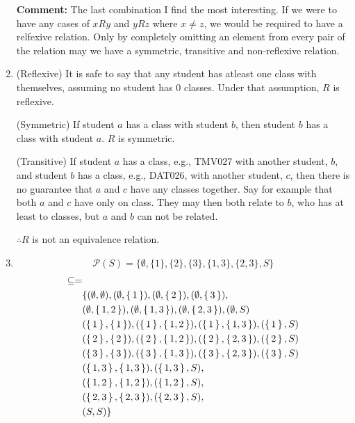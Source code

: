 \documentclass{article}
\begin{document}
\begin{enumerate}
        \textbf{Comment:} The last combination I find the most interesting. If we were to have any cases of $xRy$ and $yRz$ where $x\neq z$, we would be required to have a relfexive relation. Only by completely omitting an element from every pair of the relation may we have a symmetric, transitive and non-reflexive relation. 

    \item
        (Reflexive) It is safe to say that any student has atleast one class with themselves, assuming no student has 0 classes. Under that assumption, $R$ is reflexive.

        (Symmetric) If student $a$ has a class with student $b$, then student $b$ has a class with student $a$. $R$ is symmetric.

        (Transitive) If student $a$ has a class, e.g., TMV027 with another student, $b$, and student $b$ has a class, e.g., DAT026, with another student, $c$, then there is no guarantee that $a$ and $c$ have any classes together. Say for example that both $a$ and $c$ have only on class. They may then both relate to $b$, who has at least to classes, but $a$ and $b$ can not be related.

        $\therefore R$ is not an equivalence relation.

    \item
        $$\mathcal{P}(S) = \{\emptyset, \{1\}, \{2\}, \{3\}, \{1,3\}, \{2,3\}, S\}$$
        \begin{align*}
            \subseteq =& \\
                       &\{(\emptyset, \emptyset), (\emptyset, \set{1}), (\emptyset, \set{2}), (\emptyset,\set{3}), \\
                       &(\emptyset, \set{1,2}), (\emptyset, \set{1,3}), (\emptyset, \set{2,3}), (\emptyset, S) \\
                       &(\set{1}, \set{1}), (\set{1}, \set{1,2}), (\set{1},\set{1,3}), (\set{1}, S) \\
                       &(\set{2}, \set{2}), (\set{2}, \set{1,2}), (\set{2},\set{2,3}), (\set{2}, S) \\
                       &(\set{3}, \set{3}), (\set{3}, \set{1,3}), (\set{3},\set{2,3}), (\set{3}, S) \\
                       &(\set{1,3}, \set{1,3}), (\set{1,3}, S), \\
                       &(\set{1,2}, \set{1,2}), (\set{1,2}, S), \\
                       &(\set{2,3}, \set{2,3}), (\set{2,3}, S), \\
                       &(S,S)\}
        \end{align*}


\end{enumerate}
\end{document}
